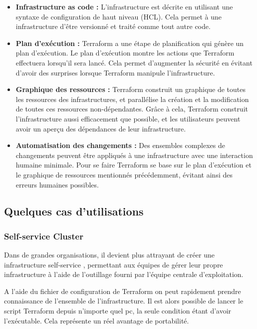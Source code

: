 \documentclass[]{article}
\begin{document}
\begin{itemize}
\item
  \textbf{Infrastructure as code :} L'infrastructure est décrite en
  utilisant une syntaxe de configuration de haut niveau (HCL). Cela
  permet à une infrastructure d'être versionné et traité comme tout autre
  code.
\item
  \textbf{Plan d'exécution :} Terraform a une étape de \og
  planification \fg qui génère un plan d'exécution. Le
  plan d'exécution montre les actions que Terraform effectuera lorsqu'il
  sera lancé. Cela permet d'augmenter la sécurité en évitant d'avoir des
  surprises lorsque Terraform manipule l'infrastructure.
\item
  \textbf{Graphique des ressources :} Terraform construit un graphique de
  toutes les ressources des infrastructures, et parallélise la création
  et la modification de toutes ces ressources non-dépendantes. Grâce à
  cela, Terraform construit l'infrastructure aussi efficacement que
  possible, et les utilisateurs peuvent avoir un aperçu des dépendances
  de leur infrastructure.
\item
  \textbf{Automatisation des changements :} Des ensembles complexes de
  changements peuvent être appliqués à une infrastructure avec une
  interaction humaine minimale. Pour se faire Terraform se base sur le
  plan d'exécution et le graphique de ressources mentionnés
  précédemment, évitant ainsi des erreurs humaines possibles.
\end{itemize}

\subsection{Quelques cas d'utilisations}\label{quelques-cas-dutilisations}

\subsubsection{Self-service Cluster}\label{self-service-cluster}

Dans de grandes organisations, il devient plus attrayant de créer une
infrastructure \og self-service \fg,
permettant aux équipes de gérer leur propre infrastructure à l'aide de
l'outillage fourni par l'équipe centrale d'exploitation.

A l'aide du fichier de configuration de Terraform on peut rapidement prendre connaissance de l'ensemble de l'infrastructure. Il est alors possible de lancer le script Terraform depuis n'importe quel pc, la seule condition étant d'avoir l'exécutable. Cela représente un réel avantage de portabilité.
\end{document}
